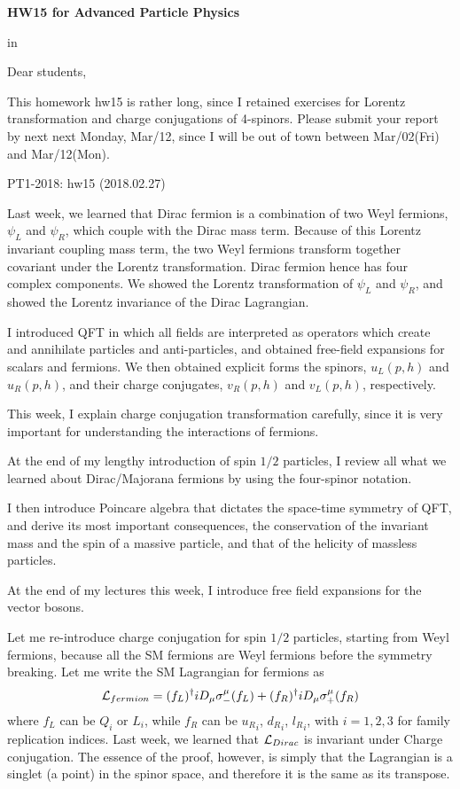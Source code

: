 \documentclass[12pt]{article}
\def\dgr{\dagger}
\begin{document}
\begin{center}
{\large\bf HW15 for Advanced Particle Physics} \\

\end{center}

 in

Dear students,

  This homework hw15 is rather long, since I retained exercises for
  Lorentz transformation and charge conjugations of 4-spinors.
  Please submit your report by next next Monday, Mar/12, since
  I will be out of town between Mar/02(Fri) and Mar/12(Mon).


PT1-2018: hw15 (2018.02.27)

  Last week, we learned that Dirac fermion is a combination of two Weyl
  fermions, $\psi_L$ and $\psi_R$, which couple with the Dirac mass term.
  Because of this Lorentz invariant coupling mass term, the two Weyl
  fermions transform together covariant under the Lorentz transformation.
  Dirac fermion hence has four complex components.  We showed the Lorentz
  transformation of $\psi_L$ and $\psi_R$, and showed the Lorentz invariance
  of the Dirac Lagrangian.

  I introduced QFT in which all fields are interpreted as operators
  which create and annihilate particles and anti-particles, and obtained
  free-field expansions for scalars and fermions.  We then obtained
  explicit forms the spinors, $u_L(p,h)$ and $u_R(p,h)$, and their charge
  conjugates, $v_R(p,h)$ and $v_L(p,h)$, respectively.

  This week, I explain charge conjugation transformation carefully,
  since it is very important for understanding the interactions of
  fermions.

  At the end of my lengthy introduction of spin $1/2$ particles, I review
  all what we learned about Dirac/Majorana fermions by using the
  four-spinor notation.

  I then introduce Poincare algebra that dictates the space-time symmetry
  of QFT, and derive its most important consequences, the conservation
  of the invariant mass and the spin of a massive particle, and that of
  the helicity of massless particles.

  At the end of my lectures this week, I introduce free field expansions
  for the vector bosons.

  Let me re-introduce charge conjugation for spin $1/2$ particles, starting
  from Weyl fermions, because all the SM fermions are Weyl fermions before
  the symmetry breaking.  Let me write the SM Lagrangian for fermions as
 \begin{eqnarray}
  {\cal L}_{fermion} = (f_L)^\dagger iD_\mu \sigma_-^\mu (f_L)
  + (f_R)^\dgr iD_\mu \sigma_+^\mu (f_R) \label{eq.15_59}
 \end{eqnarray}
  where $f_L$ can be $Q_i$ or $L_i$, while $f_R$ can be ${u_R}_i$, ${d_R}_i$, ${l_R}_i$, with $i=1,2,3$ for family replication indices. Last week, we learned that ${\cal L}_{Dirac}$ is invariant under Charge conjugation.  The essence of the proof, however, is simply that the Lagrangian is a singlet (a point) in the spinor space, and therefore it is the same as its transpose.
\end{document}
